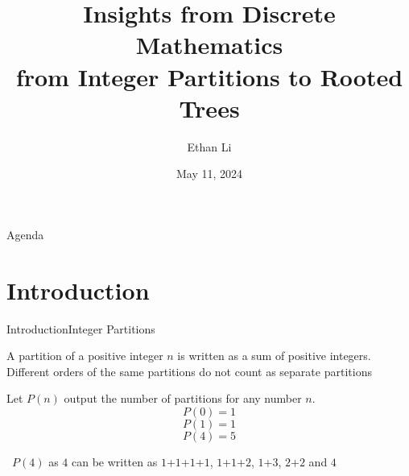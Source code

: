 \documentclass{beamer}
\title{Insights from Discrete Mathematics \\ from Integer Partitions to Rooted Trees}
\author{Ethan Li}
\date{May 11, 2024}
\begin{document}
    \begin{frame}
        \titlepage
    \end{frame}


    \begin{frame}{Agenda}
        \tableofcontents
    \end{frame}


    \section{Introduction}
    \begin{frame}{Introduction}{Integer Partitions}
        \begin{definition}
            A partition of a positive integer $n$ is written as a sum of positive integers. Different orders of the same partitions do not count as separate partitions
        \end{definition}

        \begin{example}
            Let $P(n)$ output the number of partitions for any number $n$.
            \begin{equation}
                P(0) = 1
            \end{equation}
            \begin{equation}
                P(1) = 1
            \end{equation}
            \begin{equation}
                P(4) = 5
            \end{equation}
            
            \scriptsize\centering\ $P(4)$ as $4$ can be written as $1$+$1$+$1$+$1$, $1$+$1$+$2$, $1$+$3$, $2$+$2$ and $4$
        \end{example}
    \end{frame}
\end{document}
